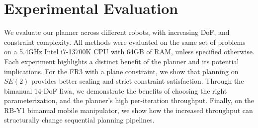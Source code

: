 \documentclass[letterpaper, 10 pt, conference]{ieeeconf}
\begin{document}










% 


\section{Experimental Evaluation}
\label{sec:expts}
We evaluate our planner across different robots, with increasing DoF, and constraint complexity. All methods were evaluated on the same set of problems on a 5.4GHz Intel i7-13700K CPU with 64GB of RAM, unless specified otherwise. Each experiment highlights a distinct benefit of the planner and its potential implications. For the FR3 with a plane constraint, we show that planning on $SE(2)$ provides better scaling and strict constraint satisfaction. Through the bimanual 14-DoF Iiwa, we demonstrate the benefits of choosing the right parameterization, and the planner's high per-iteration throughput. Finally, on the RB-Y1 bimanual mobile manipulator, we show how the increased throughput can structurally change sequential planning pipelines. 
\end{document}
